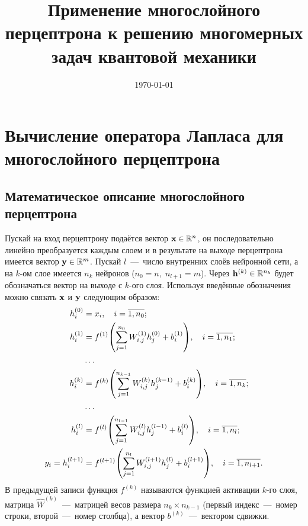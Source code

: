 \documentclass[11pt]{article}
\title{Применение многослойного перцептрона к решению многомерных задач квантовой механики}
\date{\today}
\numberwithin{equation}{section}
\begin{document}
\maketitle

\section{Вычисление оператора Лапласа для многослойного перцептрона}

\subsection{Математическое описание многослойного перцептрона}

Пускай на вход перцептрону подаётся вектор $\vb{x}\in\mathbb{R}^n$, он последовательно линейно преобразуется каждым слоем и в результате на выходе перцептрона имеется вектор $\vb{y}\in\mathbb{R}^m$. Пускай $l$~---~число внутренних слоёв нейронной сети, а на $k$-ом слое имеется $n_k$ нейронов ($n_0=n,\; n_{l+1}=m$). Через $\vb{h}^{(k)}\in\mathbb{R}^{n_k}$ будет обозначаться вектор на выходе с $k$-ого слоя. Используя введённые обозначения можно связать $\vb{x}$ и $\vb{y}$ следующим образом:
\begin{equation}
    \begin{split}
        h^{(0)}_i &= x_i,\quad i=\overline{1,n_0};\\
        h^{(1)}_i &= f^{(1)}\qty(\sum_{j=1}^{n_0} W^{(1)}_{i,j} h^{(0)}_j + b^{(1)}_i),\quad i=\overline{1,n_1};\\
        & \ldots\\
        h^{(k)}_i &= f^{(k)}\qty(\sum_{j=1}^{n_{k-1}} W^{(k)}_{i,j} h^{(k-1)}_j + b^{(k)}_i),\quad i=\overline{1,n_k};\\
        & \ldots\\
        h^{(l)}_i &= f^{(l)}\qty(\sum_{j=1}^{n_{l-1}} W^{(l)}_{i,j} h^{(l-1)}_j + b^{(l)}_i),\quad i=\overline{1,n_l};\\
        y_i = h^{(l+1)}_i &= f^{(l+1)}\qty(\sum_{j=1}^{n_{l}} W^{(l+1)}_{i,j} h^{(l)}_j + b^{(l+1)}_i),\quad i=\overline{1,n_{l+1}}.
    \end{split}
    \label{eq:perc}
\end{equation}
В предыдущей записи функция $f^{(k)}$ называются функцией активации $k$-го слоя, матрица $\hat W^{(k)}$~---~матрицей весов размера $n_k \times n_{k-1}$ (первый индекс~---~номер строки, второй~---~номер столбца), а вектор $b^{(k)}$~---~вектором сдвижки.
\end{document}
